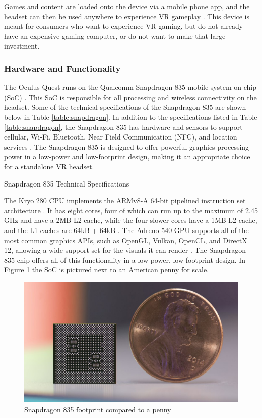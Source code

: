 Games and content are loaded onto the device via a mobile phone app, 
and the headset can then be used anywhere to experience VR gameplay \cite{quest_features}. 
This device is meant for consumers who want to experience VR gaming, 
but do not already have an expensive gaming computer, or do not want 
to make that large investment.

\subsubsection{Hardware and Functionality}
The Oculus Quest runs on the Qualcomm Snapdragon 835 mobile system on chip (SoC) \cite{oculus_dev_page}.
This SoC is responsible for all processing and wireless connectivity on the headset. Some 
of the technical specifications of the Snapdragon 835 are shown
below in Table \ref{table:snapdragon}. In addition to the specifications listed in Table
\ref{table:snapdragon}, the Snapdragon 835 has hardware and sensors to support
cellular, Wi-Fi, Bluetooth, Near Field Communication (NFC), and location services
\cite{snapdragon_835}. The Snapdragon 835 is designed to offer powerful graphics
processing power in a low-power and low-footprint design, making it an appropriate
choice for a standalone VR headset.

\begin{table}[h]
    \centering
    \caption{Snapdragon 835 Technical Specifications}
    \label{table:snapdragon} 
\end{table}

The Kryo 280 CPU implements the ARMv8-A 64-bit pipelined instruction set 
architecture \cite{kryo_arch}. It has eight cores, four of which can run up to
the maximum of 2.45 GHz and have a 2MB L2 cache, while the four slower cores have
a 1MB L2 cache, and the L1 caches are 64kB + 64kB \cite{snapdragon_cache}. The Adreno
540 GPU supports all of the most common graphics APIs, such as OpenGL, Vulkan,
OpenCL, and DirectX 12, allowing a wide support set for the visuals it can render \cite{snapdragon_835}.
The Snapdragon 835 chip offers all of this functionality in a low-power, low-footprint
design. In Figure \ref{fig:penny_835} the SoC is pictured next to an American penny for
scale.

\begin{figure}[h]
    \centering
    \includegraphics[width=.5\linewidth]{media/snapdragon_penny.jpg}
    \caption{Snapdragon 835 footprint compared to a penny \cite{penny_pic}}
    \label{fig:penny_835}
\end{figure}

